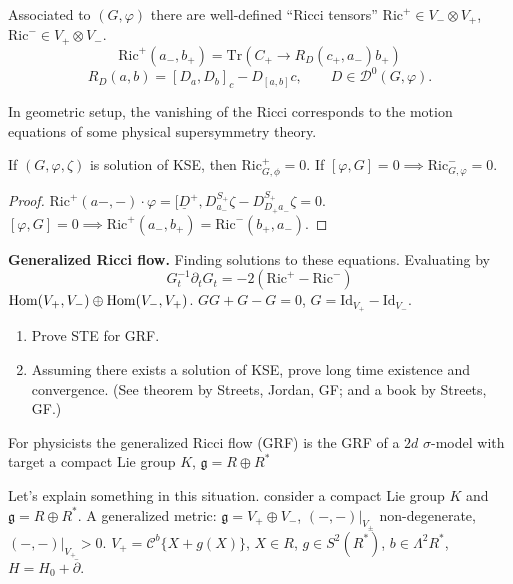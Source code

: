 \begin{lemma}
\label{lemma-Ricci-tensors}
Associated to $(G,\varphi)$ there are
well-defined ``Ricci tensors''
$\text{Ric}^+ \in V_- \otimes V_+$,
$\text{Ric}^- \in V_+ \otimes V_-$.
$$
\text{Ric}^+(a_-,b_+)=\text{Tr}(C_+ \to
R_D(c_+,a_-)b_+)
$$
$$
R_D(a,b)=[D_a,D_b]_c-D_{[a,b]}c,\qquad D \in
\mathcal{D}^0(G,\varphi).
$$
\begin{remark}
\label{remark-in-geometric-setup}
In geometric setup, the vanishing of the
Ricci corresponds to
the motion equations of some physical
supersymmetry theory.
\end{remark}

\begin{proposition}
\label{proposition-KSE}
If $(G,\varphi,\zeta)$ is solution of KSE,
then
 $\text{Ric}^+_{G,\phi}=0$.
If $[\varphi,G]=0 \implies
\text{Ric}^-_{G,\varphi}=0$.
\end{proposition}
\end{lemma}

\begin{proof}
$\text{Ric}^+(a-,-)\cdot
\varphi=[\underline{D}^+,D_{a_-}^{S_+}\zeta
-D_{D_+a_-}^{S_+}\zeta=0$.
$[\varphi,G]=0 \implies
\text{Ric}^+(a_-,b_+)=\text{Ric}^-(b_+,a_-)$.
\end{proof}

\medskip\noindent
{\bf Generalized Ricci flow.}
Finding solutions to these equations.
Evaluating by
$$
G_t^{-1}\partial_tG_t=-2(\text{Ric}^+-
\text{Ric}^-)
$$
$\mathop{\mathrm{Hom}}\nolimits(V_+,V_-) \oplus \mathop{\mathrm{Hom}}\nolimits(V_-,V_+)$.
$G G+G - G=0$,
$G=\text{Id}_{V_+}-\text{Id}_{V_-}$.

\begin{exercise}
\label{exercise-}
\begin{enumerate}
\item Prove STE for GRF.
\item Assuming there exists a solution of
KSE, prove long
time existence and convergence. (See theorem
by Streets, Jordan, GF;
and a book by Streets, GF.)
\end{enumerate}
\end{exercise}

\begin{remark}
\label{remark-sigma-model}
For physicists the generalized Ricci flow
(GRF) is the GRF of a $2d$
$\sigma$-model with target a compact Lie
group
$K$,  $\mathfrak{g}=R \oplus R^*$
\end{remark}

Let's explain something in this situation.
consider a compact Lie group $K$ and
$\mathfrak{g}=R \oplus R^*$.
A generalized metric: $\mathfrak{g}=V_+
\oplus V_-$,
$(-,-)|_{V_\pm}$ non-degenerate,
$(-,-)|_{V_+}>0$.
$V_+=\mathcal{C}^b\{X+g(X)\}$,
$X \in R$, $g \in S^2(R^*)$, $b \in
\Lambda^{2}R^*$,
$H=H_0+\overline{\partial}$.


